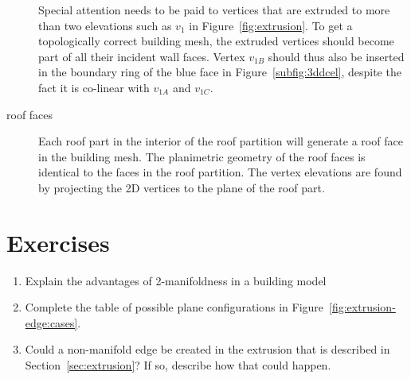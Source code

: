 \begin{description}
Special attention needs to be paid to vertices that are extruded to more than two elevations such as $v_1$ in Figure~\ref{fig:extrusion}.
To get a topologically correct building mesh, the extruded vertices should become part of all their incident wall faces.
Vertex $v_{1B}$ should thus also be inserted in the boundary ring of the blue face in Figure~\ref{subfig:3ddcel}, despite the fact it is co-linear with $v_{1A}$ and $v_{1C}$.

\item[roof faces]  Each roof part in the interior of the roof partition will generate a roof face in the building mesh. The planimetric geometry of the roof faces is identical to the faces in the roof partition. The vertex elevations are found by projecting the 2D vertices to the plane of the roof part.
\end{description}

%



%
\section{Exercises}

\begin{enumerate}
  \item Explain the advantages of 2-manifoldness in a building model
  \item Complete the table of possible plane configurations in Figure~\ref{fig:extrusion-edge:cases}.
  \item Could a non-manifold edge be created in the extrusion that is described in Section~\ref{sec:extrusion}? If so, describe how that could happen.
\end{enumerate}








